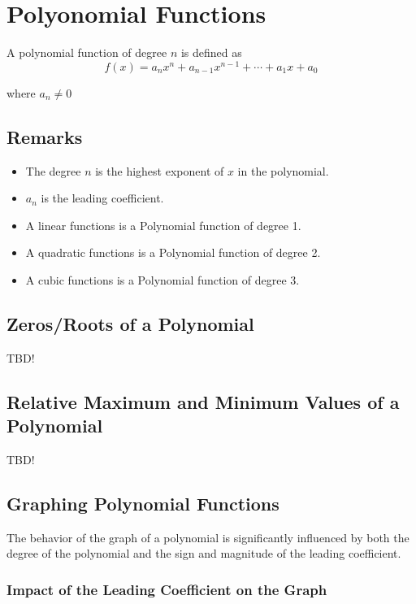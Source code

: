 
\section{Polyonomial Functions}
\begin{definition} 
  A polynomial function of degree $n$ is defined as 
  \[
  f(x) = a_n x^n + a_{n-1} x^{n-1} + \cdots + a_1 x + a_0
  \]
  
  where $a_{n } \neq 0$
\end{definition}

\subsection*{Remarks}
\begin{itemize}
\item The degree \( n \) is the highest exponent of \( x \) in the polynomial.
\item \( a_n \) is the leading coefficient. 
\item A linear functions is a Polynomial function of degree 1.
\item A quadratic functions is a Polynomial function of degree 2.
\item A cubic functions is a Polynomial function of degree 3.
\end{itemize}


\subsection{Zeros/Roots of a Polynomial}

TBD!
\subsection{Relative Maximum and Minimum Values of a Polynomial}
TBD!

\subsection{Graphing Polynomial Functions}

The behavior of the graph of a polynomial is significantly influenced by both the degree of the polynomial and the sign and magnitude of the leading coefficient. 



\subsubsection{Impact of the Leading Coefficient on the Graph}

